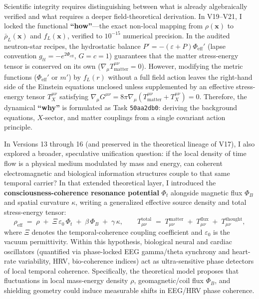 \documentclass[10pt,a4paper]{article}
\begin{document}
\par
Scientific integrity requires distinguishing between what is already algebraically verified and what requires a deeper field-theoretical derivation. In V19--V21, I locked the functional \textbf{``how''}---the exact non-local mapping from $\rho(\mathbf{x})$ to $\bar{\rho}_L(\mathbf{x})$ and $f_L(\mathbf{x})$, verified to $10^{-15}$ numerical precision. In the audited neutron-star recipes, the hydrostatic balance $P' = -(\varepsilon+P)\Phi_{\text{eff}}'$ (lapse convention $g_{tt} = -e^{2\Phi_{\text{eff}}}$, $G=c=1$) guarantees that the matter stress-energy tensor is conserved on its own ($\nabla_\mu T^{\mu\nu}_{\text{matter}} = 0$). However, modifying the metric functions ($\Phi_{\text{eff}}'$ or $m'$) by $f_L(r)$ without a full field action leaves the right-hand side of the Einstein equations unclosed unless supplemented by an effective stress-energy tensor $T^{\mu\nu}_X$ satisfying $\nabla_\mu G^{\mu\nu} = 8\pi\nabla_\mu(T^{\mu\nu}_{\text{matter}} + T^{\mu\nu}_X) = 0$. Therefore, the dynamical \textbf{``why''} is formulated as Task \texttt{50aa2db0}: deriving the background equations, $X$-sector, and matter couplings from a single covariant action principle.

\par
In Versions 13 through 16 (and preserved in the theoretical lineage of V17), I also explored a broader, speculative unification question: if the local density of time flow is a physical medium modulated by mass and energy, can coherent electromagnetic and biological information structures couple to that same temporal carrier? In that extended theoretical layer, I introduced the \textbf{consciousness-coherence resonance potential} $\Phi_t$ alongside magnetic flux $\Phi_B$ and spatial curvature $\kappa$, writing a generalized effective source density and total stress-energy tensor:
\begin{equation}
  \rho_{\text{eff}} \;=\; \rho \;+\; \Xi\,\varepsilon_0\,\Phi_t \;+\; \beta\,\Phi_B \;+\; \gamma\,\kappa, \qquad
  T_{\mu\nu}^{\text{total}} \;=\; T_{\mu\nu}^{\text{matter}} \;+\; T_{\mu\nu}^{\text{flux}} \;+\; T_{\mu\nu}^{\text{thought}},
\end{equation}
where $\Xi$ denotes the temporal-coherence coupling coefficient and $\varepsilon_0$ is the vacuum permittivity. Within this hypothesis, biological neural and cardiac oscillators (quantified via phase-locked EEG gamma/theta synchrony and heart-rate variability, HRV, bio-coherence indices) act as ultra-sensitive phase detectors of local temporal coherence. Specifically, the theoretical model proposes that fluctuations in local mass-energy density $\rho$, geomagnetic/coil flux $\Phi_B$, and shielding geometry could induce measurable shifts in EEG/HRV phase coherence.
\end{document}

